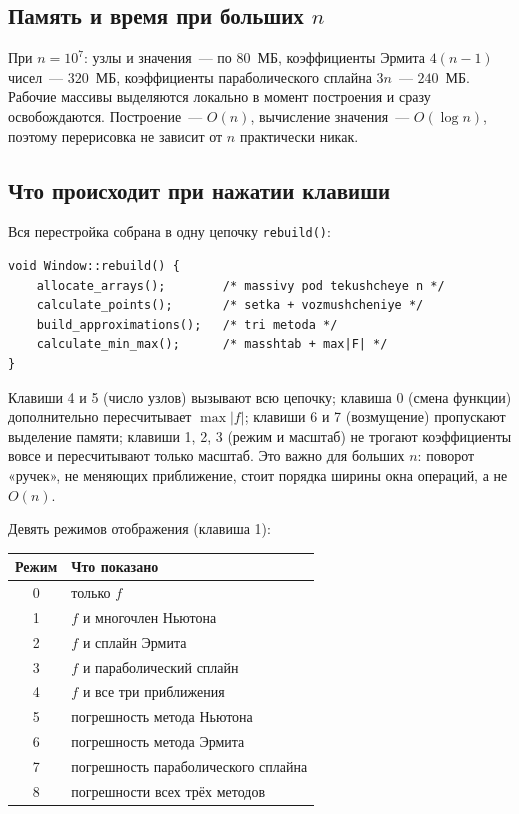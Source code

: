 \documentclass[11pt,a4paper]{report}
\begin{document}
\subsection{Память и время при больших $n$}

При $n=10^7$: узлы и значения~--- по $80$~МБ, коэффициенты Эрмита
$4(n-1)$ чисел~--- $320$~МБ, коэффициенты параболического сплайна $3n$~---
$240$~МБ. Рабочие массивы выделяются локально в момент построения и сразу
освобождаются. Построение~--- $O(n)$, вычисление значения~--- $O(\log n)$,
поэтому перерисовка не зависит от $n$ практически никак.

\subsection{Что происходит при нажатии клавиши}

Вся перестройка собрана в одну цепочку \texttt{rebuild()}:
\begin{lstlisting}[style=cpp]
void Window::rebuild() {
    allocate_arrays();        /* massivy pod tekushcheye n */
    calculate_points();       /* setka + vozmushcheniye */
    build_approximations();   /* tri metoda */
    calculate_min_max();      /* masshtab + max|F| */
}
\end{lstlisting}
Клавиши 4 и 5 (число узлов) вызывают всю цепочку; клавиша 0 (смена функции)
дополнительно пересчитывает $\max|f|$; клавиши 6 и 7 (возмущение) пропускают
выделение памяти; клавиши 1, 2, 3 (режим и масштаб) не трогают коэффициенты
вовсе и пересчитывают только масштаб. Это важно для больших $n$: поворот
«ручек», не меняющих приближение, стоит порядка ширины окна операций, а не
$O(n)$.

Девять режимов отображения (клавиша 1):
\begin{center}
\begin{tabular}{cl}
\toprule
Режим & Что показано \\
\midrule
0 & только $f$ \\
1 & $f$ и многочлен Ньютона \\
2 & $f$ и сплайн Эрмита \\
3 & $f$ и параболический сплайн \\
4 & $f$ и все три приближения \\
5 & погрешность метода Ньютона \\
6 & погрешность метода Эрмита \\
7 & погрешность параболического сплайна \\
8 & погрешности всех трёх методов \\
\bottomrule
\end{tabular}
\end{center}
\end{document}
